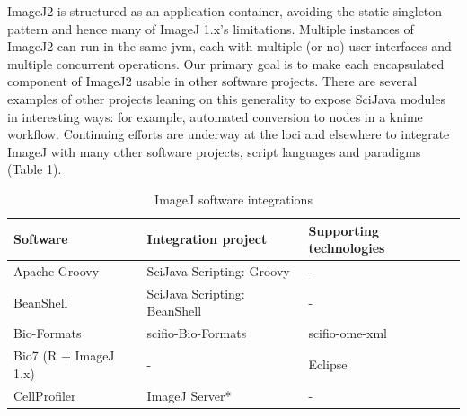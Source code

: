 \documentclass{bmcart}
\begin{document}
ImageJ2 is structured as an application container, avoiding the static
singleton pattern and hence many of ImageJ 1.x's limitations. Multiple
instances of ImageJ2 can run in the same \acrshort{jvm}, each with multiple (or
no) user interfaces and multiple concurrent operations. Our primary goal is to
make each encapsulated component of ImageJ2 usable in other software projects.
There are several examples of other projects leaning on this generality to
expose SciJava modules in interesting ways: for example, automated conversion
to nodes in a \acrshort{knime} workflow. Continuing efforts are underway at
the \acrfull{loci} and elsewhere to integrate ImageJ with many other software
projects, script languages and paradigms (Table 1).

  \begin{table}[h!]
    \caption{ImageJ software integrations}
    \begin{tabular}{| l | l | l |}
      \hline
      \textbf{Software}                                                  & \textbf{Integration project}                                         & \textbf{Supporting technologies}                                           \\ \hline
      Apache Groovy                               \cite{groovy}          & SciJava Scripting: Groovy             \cite{scripting_groovy}        & -                                                                          \\ \hline
      BeanShell                                   \cite{beanshell}       & SciJava Scripting: BeanShell          \cite{scripting_beanshell}     & -                                                                          \\ \hline
      Bio-Formats                                 \cite{bio_formats}     & \acrshort{scifio}-Bio-Formats         \cite{scifio_bf_compat}        & \acrshort{scifio}-\acrshort{ome}-\acrshort{xml}     \cite{scifio_ome_xml}  \\ \hline
      Bio7 (R + ImageJ 1.x)                       \cite{bio7}            & -                                                                    & Eclipse                                             \cite{eclipse}         \\ \hline
      CellProfiler                                \cite{cellprofiler}    & ImageJ Server*                        \cite{imagej_server}           & -                                                                          \\ \hline

\end{tabular}
\end{table}
\end{document}
